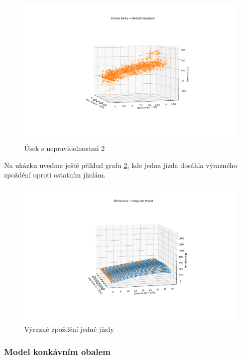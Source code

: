 \begin{figure}
\centering
  \includegraphics[width=\linewidth]{../img/divoka_sarka_veleslavin.png}
  \caption{Úsek s nepravidelnostmi 2}
  \label{fig:divoka_sarka_veleslavin}
\end{figure}


Na ukázku uveďme ještě příklad grafu \ref{fig:delayed_trip}, kde jedna jízda dosáhla výrazného zpoždění oproti ostatním jízdám.


\begin{figure}
\centering
  \includegraphics[width=\linewidth]{../img/delayed_trip.png}
  \caption{Výrazné zpoždění jedné jízdy}
  \label{fig:delayed_trip}
\end{figure}


\subsubsection{Model konkávním obalem}


